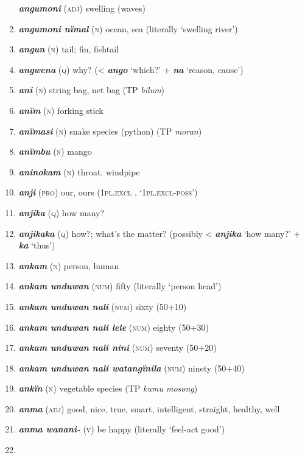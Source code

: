 \begin{enumerate}[noitemsep, label={}, align=left, widest=190, labelsep=1ex,leftmargin=*,itemindent=-10pt]
\textbf{\textit{angumoni}} (\textsc{adj}) swelling (waves) \item 
\textbf{\textit{angumoni nïmal}} (\textsc{n}) ocean, sea (literally ‘swelling river’) \item 
\textbf{\textit{angun}} (\textsc{n}) tail; fin, fishtail \item 
\textbf{\textit{angwena}} (\textsc{q}) why? (< \textbf{\textit{ango}} ‘which?’ + \textbf{\textit{na}} ‘reason, cause’) \item 
\textbf{\textit{ani}} (\textsc{n}) string bag, net bag (TP \textit{bilum}) \item 
\textbf{\textit{anïm}} (\textsc{n}) forking stick \item 
\textbf{\textit{anïmasi}} (\textsc{n}) snake species (python) (TP \textit{moran}) \item 
\textbf{\textit{anïmbu}} (\textsc{n}) mango \item 
\textbf{\textit{aninokam}} (\textsc{n}) throat, windpipe \item 
\textbf{\textit{anji}} (\textsc{pro}) our, ours (\textsc{1pl.excl} , ‘\textsc{1pl.excl-poss}’) \item 
\textbf{\textit{anjika}} (\textsc{q}) how many? \item 
\textbf{\textit{anjikaka}} (\textsc{q}) how?; what’s the matter? (possibly < \textbf{\textit{anjika}} ‘how many?’ + \textbf{\textit{ka}} ‘thus’) \item 
\textbf{\textit{ankam}} (\textsc{n}) person, human \item 
\textbf{\textit{ankam unduwan}} (\textsc{num}) fifty (literally ‘person head’) \item 
\textbf{\textit{ankam unduwan nali}} (\textsc{num}) sixty (50+10) \item 
\textbf{\textit{ankam unduwan nali lele}} (\textsc{num}) eighty (50+30) \item 
\textbf{\textit{ankam unduwan nali nini}} (\textsc{num}) seventy (50+20) \item 
\textbf{\textit{ankam unduwan nali watangïnila}} (\textsc{num}) ninety (50+40) \item 
\textbf{\textit{ankïn}} (\textsc{n}) vegetable species (TP \textit{kumu mosong}) \item 
\textbf{\textit{anma}} (\textsc{adj}) good, nice, true, smart, intelligent, straight, healthy, well \item 
\textbf{\textit{anma wanani-}} (\textsc{v}) be happy (literally ‘feel-act good’) \item 

\end{enumerate}

